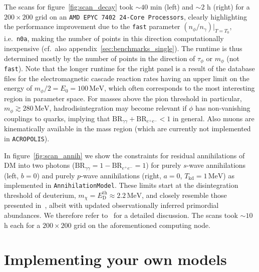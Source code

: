 \documentclass[11pt,a4paper]{article}
\begin{document}
The scans for figure~\ref{fig:scan_decay} took $\sim 40$ min (left) and $\sim 2$ h (right) for a $200 \times 200$ grid on an  \texttt{AMD EPYC 7402 24-Core Processors}, clearly highlighting the performance improvement due to the \texttt{fast} parameter $(n_\phi/n_\gamma)|_{T=T_0}$, i.e.\ \texttt{n0a}, making the number of points in this direction computationally inexpensive (cf.\ also appendix~\ref{sec:benchmarks_single}). The runtime is thus determined mostly by the number of points in the direction of $\tau_\phi$ or $m_\phi$ (not \texttt{fast}). Note that the longer runtime for the right panel is a result of the database files for the electromagnetic cascade reaction rates having an upper limit on the energy of $m_\phi/2 = E_0 = 100 \, \mathrm{MeV}$, which often corresponds to the most interesting region in parameter space. For masses above the pion threshold in particular, $m_\phi \gtrsim 280 \, \mathrm{MeV}$, hadrodisintegration may become relevant if $\phi$ has non-vanishing couplings to quarks, implying that $\text{BR}_{\gamma \gamma} + \text{BR}_{e^+ e^-} < 1$ in general. Also muons are kinematically available in the mass region (which are currently not implemented in \texttt{ACROPOLIS}).

In figure~\ref{fig:scan_annih} we show the constraints for residual annihilations of DM into two photons ($\text{BR}_{\gamma \gamma} = 1 - \text{BR}_{e^+ e^-} = 1$) for purely $s$-wave annihilations (left, $b = 0$) and purely $p$-wave annihilations (right, $a = 0$, $T_\mathrm{kd} = 1 \, \mathrm{MeV}$) as implemented in \texttt{AnnihilationModel}. These limits start at the disintegration threshold of deuterium, $m_\chi = E_\mathrm{D}^\mathrm{th} \approx 2.2 \, \mathrm{MeV}$, and closely resemble those presented in~\cite{Depta:2019lbe}, albeit with updated observationally inferred primordial abundances. We therefore refer to~\cite{Depta:2019lbe} for a detailed discussion. The scans took $\sim 10$ h each for a $200 \times 200$ grid on the aforementioned computing node.

\section{Implementing your own models}
\label{sec:implementing_models}
\end{document}

